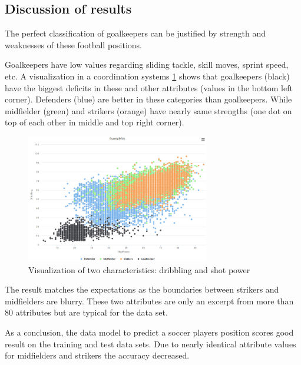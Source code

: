 \subsection{Discussion of results}
\label{sec:DiscussionResults}
The perfect classification of goalkeepers can be justified by strength and weaknesses of these football positions.

 Goalkeepers have low values regarding sliding tackle, skill moves, sprint speed, etc. A visualization in a coordination systems \ref{fig:VisualAttributes} shows that goalkeepers (black) have the biggest deficits in these and other attributes (values in the bottom left corner). Defenders (blue) are better in these categories than goalkeepers. While midfielder (green) and strikers (orange) have nearly same strengths (one dot on top of each other in middle and top right corner). 

\begin{figure}
\centering
  \includegraphics[width=8cm]{VisualizationAttributes.jpg}
  \caption{Visualization of two characteristics: dribbling and shot power}
  \label{fig:VisualAttributes}
\end{figure}

The result matches the expectations as the boundaries between strikers and midfielders are blurry. These two attributes are only an excerpt from more than 80 attributes but are typical for the data set.

As a conclusion, the data model to predict a soccer players position scores good result on the training and test data sets. Due to nearly identical attribute values for midfielders and strikers the accuracy decreased.